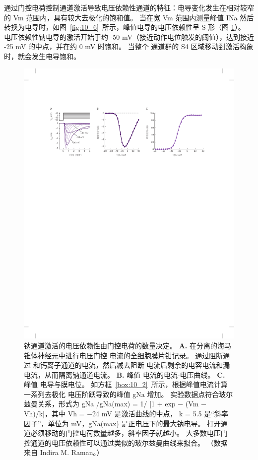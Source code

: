 通过门控电荷控制通道激活导致电压依赖性通道的特征：电导变化发生在相对较窄的 Vm 范围内，具有较大去极化的饱和值。
当在宽 Vm 范围内测量峰值 INa 然后转换为电导时，如图~\ref{fig:10_6}~所示，峰值电导的电压依赖性呈 S 形（图 \ref{fig:10_11}）。
电压依赖性钠电导的激活开始于约 -50 mV（接近动作电位触发的阈值），达到接近 -25 mV 的中点，并在约 0 mV 时饱和。 
当整个  通道群的 S4 区域移动到激活构象时，就会发生电导饱和。


\begin{figure}[htbp]
	\centering
	\includegraphics[width=0.9\linewidth]{chap10/fig_10_11}
	\caption{钠通道激活的电压依赖性由门控电荷的数量决定。
		\textbf{A.} 在分离的海马锥体神经元中进行电压门控  电流的全细胞膜片钳记录。
		通过阻断通过  和钙离子通道的电流，然后减去阻断  电流后剩余的电容电流和漏电流，从而隔离钠通道电流。
		\textbf{B.} 峰值  电流的电流-电压曲线。
		\textbf{C.} 峰值  电导与膜电位。 如方框~\ref{box:10_2}~所示，根据峰值电流计算一系列去极化
		电压阶跃导致的峰值 gNa 增加。
		实验数据点符合玻尔兹曼关系，形式为 gNa /gNa(max) = 1/ [1 + exp − (Vm − Vh)/k]，其中 Vh = −24 mV 是激活曲线的中点， k = 5.5 是“斜率因子”，单位为 mV，gNa(max) 是正电压下的最大钠电导。
		打开通道必须移动的门控电荷数量越多，斜率因子就越小。
		大多数电压门控通道的电压依赖性可以通过类似的玻尔兹曼曲线来拟合。 （数据来自 Indira M. Raman。）}
	\label{fig:10_11}
\end{figure}


